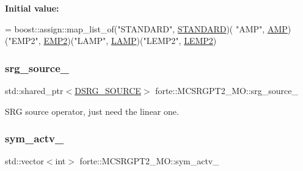 {\bfseries Initial value\+:}
\begin{DoxyCode}
= boost::assign::map\_list\_of(\textcolor{stringliteral}{"STANDARD"}, \mbox{\hyperlink{classforte_1_1_m_c_s_r_g_p_t2___m_o_a541d16aa14bd6d3e685b6bda0b8602f1a0b64256e8b44dbe842be9d5698318579}{STANDARD}})(
        \textcolor{stringliteral}{"AMP"}, \mbox{\hyperlink{classforte_1_1_m_c_s_r_g_p_t2___m_o_a541d16aa14bd6d3e685b6bda0b8602f1a5811e417c1c498623bd94d1d5013df95}{AMP}})(\textcolor{stringliteral}{"EMP2"}, \mbox{\hyperlink{classforte_1_1_m_c_s_r_g_p_t2___m_o_a541d16aa14bd6d3e685b6bda0b8602f1ae712aa6a2ffadd5f220d8f1700eb94af}{EMP2}})(\textcolor{stringliteral}{"LAMP"}, \mbox{\hyperlink{classforte_1_1_m_c_s_r_g_p_t2___m_o_a541d16aa14bd6d3e685b6bda0b8602f1af1f23d90950da0348be1b106dd5c84b3}{LAMP}})(\textcolor{stringliteral}{"LEMP2"}, \mbox{\hyperlink{classforte_1_1_m_c_s_r_g_p_t2___m_o_a541d16aa14bd6d3e685b6bda0b8602f1a1988646a02aba967738d55d47907fd28}{LEMP2}})
\end{DoxyCode}
\mbox{\label{classforte_1_1_m_c_s_r_g_p_t2___m_o_a0bdb54b9f324182b06da2e1e8902530a}} 
\subsubsection{\texorpdfstring{srg\+\_\+source\+\_\+}{srg\_source\_}}
{\footnotesize\ttfamily std\+::shared\+\_\+ptr$<$\mbox{\hyperlink{classforte_1_1_d_s_r_g___s_o_u_r_c_e}{D\+S\+R\+G\+\_\+\+S\+O\+U\+R\+CE}}$>$ forte\+::\+M\+C\+S\+R\+G\+P\+T2\+\_\+\+M\+O\+::srg\+\_\+source\+\_\+\hspace{0.3cm}{\ttfamily [protected]}}



S\+RG source operator, just need the linear one. 

\mbox{\label{classforte_1_1_m_c_s_r_g_p_t2___m_o_a9eba1f5e4fa8e9e096c87d86f7ad1f90}} 
\subsubsection{\texorpdfstring{sym\+\_\+actv\+\_\+}{sym\_actv\_}}
{\footnotesize\ttfamily std\+::vector$<$int$>$ forte\+::\+M\+C\+S\+R\+G\+P\+T2\+\_\+\+M\+O\+::sym\+\_\+actv\+\_\+\hspace{0.3cm}{\ttfamily [protected]}}



